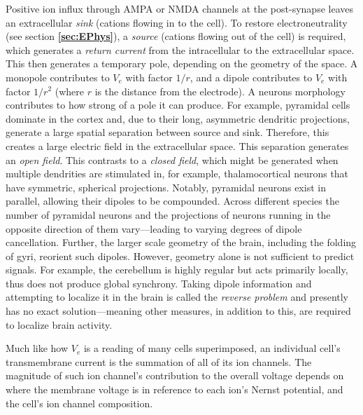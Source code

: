    Positive ion influx through AMPA or NMDA channels at the post-synapse leaves an extracellular \textit{sink} (cations flowing in to the cell). To restore electroneutrality (see section \textbf{\ref{sec:EPhys}}), a \textit{source} (cations flowing out of the cell) is required, which generates a \textit{return current} from the intracellular to the extracellular space. This then generates a temporary pole, depending on the geometry of the space. A monopole contributes to $V_e$ with factor $1/r$, and a dipole contributes to $V_e$ with factor $1/r^2$ (where $r$ is the distance from the electrode). A neurons morphology contributes to how strong of a pole it can produce. For example, pyramidal cells dominate in the cortex and, due to their long, asymmetric dendritic projections, generate a large spatial separation between source and sink. Therefore, this creates a large electric field in the extracellular space. This separation generates an \textit{open field}. This contrasts to a \textit{closed field}, which might be generated when multiple dendrities are stimulated in, for example, thalamocortical neurons that have symmetric, spherical projections. Notably, pyramidal neurons exist in parallel, allowing their dipoles to be compounded. Across different species the number of pyramidal neurons and the projections of neurons running in the opposite direction of them vary---leading to varying degrees of dipole cancellation. Further, the larger scale geometry of the brain, including the folding of gyri, reorient such dipoles. However, geometry alone is not sufficient to predict signals. For example, the cerebellum is highly regular but acts primarily locally, thus does not produce global synchrony. Taking dipole information and attempting to localize it in the brain is called the \textit{reverse problem} and presently has no exact solution---meaning other measures, in addition to this, are required to localize brain activity.\newline
    
    Much like how $V_e$ is a reading of many cells superimposed, an individual cell's transmembrane current is the summation of all of its ion channels. The magnitude of such ion channel's contribution to the overall voltage depends on where the membrane voltage is in reference to each ion's Nernst potential, and the cell's ion channel composition.\newline

